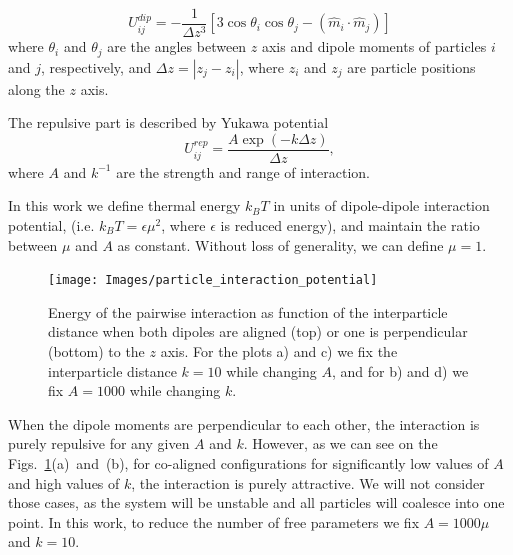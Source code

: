 \begin{equation}
\label{eq:dipole_dipole_1D}
U_{ij}^{dip} = - \frac{1}{\Delta z^3} [3 \cos \theta_i \cos \theta_j - (\hat{m}_i \cdot \hat{m}_j)]
\end{equation}
where $\theta_i$ and $\theta_j$ are the angles between $z$ axis and dipole moments of particles $i$ and $j$, respectively, and $\Delta z = |z_j - z_i|$, where $z_i$ and $z_j$ are particle positions along the $z$ axis.

The repulsive part is described by Yukawa potential
\begin{equation}
\label{eq:yukawa_interaction}
U_{ij}^{rep} = \frac{A \exp(-k \Delta z)}{\Delta z},
\end{equation}
where $A$ and $k^{-1}$ are the strength and range of interaction. 

In this work we define thermal energy $k_BT$ in units of dipole-dipole interaction potential, (i.e. $k_BT = \epsilon \mu^2$, where $\epsilon$ is reduced energy), and maintain the ratio between $\mu$ and $A$ as constant. Without loss of generality, we can define $\mu = 1$.

\begin{figure}[h]
\centering
	\texttt{[image: Images/particle\_interaction\_potential]}
\captionsetup{justification=centering, width=0.9\columnwidth}
\caption{Energy of the pairwise interaction as function of the interparticle distance when both dipoles are aligned (top) or one is perpendicular (bottom) to the $z$ axis. For the plots a) and c) we fix the interparticle distance $k = 10$ while changing $A$, and for b) and d) we fix $A = 1000$ while changing $k$.}
\label{fig:interaction_energy}
\end{figure}

When the dipole moments are perpendicular to each other, the interaction is purely repulsive for any given $A$ and $k$. However, as we can see on the Figs.~\ref{fig:interaction_energy}(a)~and~(b), for co-aligned configurations for significantly low values of $A$ and high values of $k$, the interaction is purely attractive. We will not consider those cases, as the system will be unstable and all particles will coalesce into one point. In this work, to reduce the number of free parameters we fix $A = 1000 \mu$ and $k = 10$.
